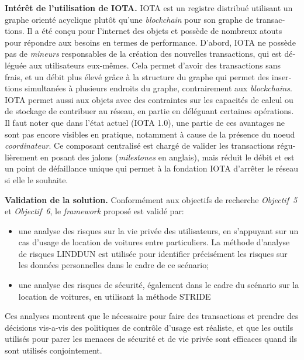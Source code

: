 \begin{otherlanguage}{french}
\textbf{Intérêt de l'utilisation de IOTA.} IOTA est un registre distribué utilisant un graphe orienté acyclique plutôt qu'une \emph{blockchain} pour son graphe de transactions. Il a été conçu pour l'internet des objets \cite{Popov2017} et possède de nombreux atouts pour répondre aux besoins en termes de performance. 
D'abord, IOTA ne possède pas de \emph{mineurs} responsables de la création des nouvelles transactions, qui est déléguée aux utilisateurs eux-mêmes. Cela permet d'avoir des transactions sans frais, et un débit plus élevé grâce à la structure du graphe qui permet des insertions simultanées à plusieurs endroits du graphe, contrairement aux \emph{blockchains}. IOTA permet aussi aux objets avec des contraintes sur les capacités de calcul ou de stockage de contribuer au réseau, en partie en déléguant certaines opérations. Il faut noter que dans l'état actuel (IOTA 1.0), une partie de ces avantages ne sont pas encore visibles en pratique, notamment à cause de la présence du noeud \emph{coordinateur}. Ce composant centralisé est chargé de valider les transactions régulièrement en posant des jalons (\emph{milestones} en anglais), mais réduit le débit et est un point de défaillance unique qui permet à la fondation IOTA d'arrêter le réseau si elle le souhaite.

\textbf{Validation de la solution.} Conformément aux objectifs de recherche \emph{Objectif~5} et \emph{Objectif~6}, le \emph{framework} proposé est validé par:

\begin{itemize}
    \item une analyse des risques sur la vie privée des utilisateurs, en s'appuyant sur un cas d'usage de location de voitures entre particuliers. La méthode d'analyse de risques LINDDUN \cite{Wuyts2015} est utilisée pour identifier précisément les risques sur les données personnelles dans le cadre de ce scénario;
    \item une analyse des risques de sécurité, également dans le cadre du scénario sur la location de voitures, en utilisant la méthode STRIDE \cite{Howard2006} 
\end{itemize}

Ces analyses montrent que le nécessaire pour faire des transactions et prendre des décisions vis-a-vis des politiques de contrôle d'usage est réaliste, et que les outils utilisés pour parer les menaces de sécurité et de vie privée sont efficaces quand ils sont utilisés conjointement.


\end{otherlanguage}
